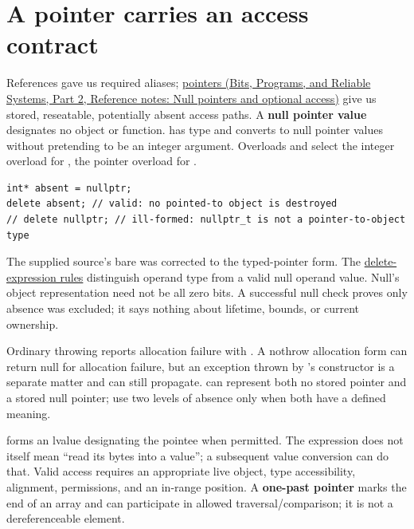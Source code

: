 \section{A pointer carries an access contract}\label{05-engine-i-ch003-a-pointer-carries-an-access-contract}

\hypertarget{05-engine-i-ch003-a-pointer-carries-an-access-contract}{}

References gave us required aliases; \href{../01-Bits-Programs-and-Reliable-Systems-P02/main.pdf\#nameddest=appendix-afae48c31800}{pointers (Bits, Programs, and Reliable Systems, Part 2, Reference notes: Null pointers and optional access)} give us stored, reseatable, potentially absent access paths. A \textbf{null pointer value} designates no object or function.  has type  and converts to null pointer values without pretending to be an integer argument. Overloads  and  select the integer overload for , the pointer overload for .

\begin{verbatim}
int* absent = nullptr;
delete absent; // valid: no pointed-to object is destroyed
// delete nullptr; // ill-formed: nullptr_t is not a pointer-to-object type
\end{verbatim}

The supplied source's bare  was corrected to the typed-pointer form. The \href{https://eel.is/c++draft/expr.delete}{delete-expression rules} distinguish operand type from a valid null operand value. Null's object representation need not be all zero bits. A successful null check proves only absence was excluded; it says nothing about lifetime, bounds, or current ownership.

Ordinary throwing  reports allocation failure with . A nothrow allocation form can return null for allocation failure, but an exception thrown by 's constructor is a separate matter and can still propagate.  can represent both no stored pointer and a stored null pointer; use two levels of absence only when both have a defined meaning.

 forms an lvalue designating the pointee when permitted. The expression does not itself mean ``read its bytes into a value''; a subsequent value conversion can do that. Valid access requires an appropriate live object, type accessibility, alignment, permissions, and an in-range position. A \textbf{one-past pointer} marks the end of an array and can participate in allowed traversal/comparison; it is not a dereferenceable element.

